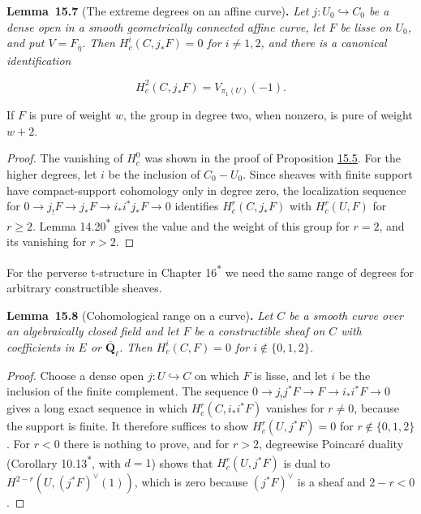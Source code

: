 \documentclass[11pt]{article}
\newenvironment{bpstatement}[2]{\par\addvspace{0.6\baselineskip}\noindent\textbf{#1}#2\textbf{.}\enspace\ignorespaces}
  {\par\addvspace{0.4\baselineskip}}
\newenvironment{bpstatementit}[2]{\begin{bpstatement}{#1}{#2}\itshape\ignorespaces}{\end{bpstatement}}
\newcommand{\bpout}[1]{#1\textsuperscript{\hyperlink{bp-outside}{\ensuremath{\ast}}}}
\begin{document}
\label{bp19}%
\begin{bpstatementit}{Lemma~15.7}{ (The extreme degrees on an affine curve)}
Let \(j:U_0\hookrightarrow C_0\) be a dense open in a smooth geometrically connected affine curve, let \(F\) be lisse on \(U_0\), and put \(V=F_{\bar\eta}\). Then \(H_c^i(C,j_*F)=0\) for \(i\ne1,2\), and there is a canonical identification

\[
H_c^2(C,j_*F)=V_{\pi_1(U)}(-1).
\]

If \(F\) is pure of weight \(w\), the group in degree two, when nonzero, is pure of weight \(w+2\).
\end{bpstatementit}

\begin{proof}[{Proof}]\label{bp20}%
The vanishing of \(H^0_c\) was shown in the proof of Proposition \hyperref[bp13]{15.5}. For the higher degrees, let \(i\) be the inclusion of \(C_0-U_0\). Since sheaves with finite support have compact-support cohomology only in degree zero, the localization sequence for \(0\to j_!F\to j_*F\to i_*i^*j_*F\to0\) identifies \(H^r_c(C,j_*F)\) with \(H_c^r(U,F)\) for \(r\ge2\). Lemma \bpout{14.20} gives the value and the weight of this group for \(r=2\), and its vanishing for \(r>2\).
\end{proof}

\label{bp21}%
For the perverse t-structure in Chapter \bpout{16} we need the same range of degrees for arbitrary constructible sheaves.

\label{bp22}%
\begin{bpstatementit}{Lemma~15.8}{ (Cohomological range on a curve)}
Let \(C\) be a smooth curve over an algebraically closed field and let \(F\) be a constructible sheaf on \(C\) with coefficients in \(E\) or \(\overline{\mathbf Q}_\ell\). Then \(H^i_c(C,F)=0\) for \(i\notin\{0,1,2\}\).
\end{bpstatementit}

\begin{proof}[{Proof}]\label{bp23}%
Choose a dense open \(j:U\hookrightarrow C\) on which \(F\) is lisse, and let \(i\) be the inclusion of the finite complement. The sequence \(0\to j_!j^*F\to F\to i_*i^*F\to0\) gives a long exact sequence in which \(H^r_c(C,i_*i^*F)\) vanishes for \(r\ne0\), because the support is finite. It therefore suffices to show \(H^r_c(U,j^*F)=0\) for \(r\notin\{0,1,2\}\). For \(r<0\) there is nothing to prove, and for \(r>2\), degreewise Poincaré duality (Corollary \bpout{10.13}, with \(d=1\)) shows that \(H^r_c(U,j^*F)\) is dual to \(H^{2-r}(U,(j^*F)^\vee(1))\), which is zero because \((j^*F)^\vee\) is a sheaf and \(2-r<0\).
\end{proof}
\end{document}
